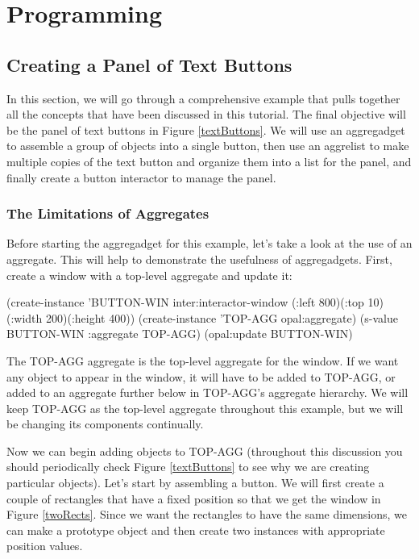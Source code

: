 \chapter{Programming}

\section{Creating a Panel of Text Buttons}
\label{big-example}

In this section, we will go through a comprehensive example that pulls
together all the concepts that have been discussed in this tutorial.
The final objective will be the panel of text buttons in Figure
\ref{textButtons}.  We will use an aggregadget to assemble a group
of objects into a single button, then use an aggrelist to make
multiple copies of the text button and organize them into a list for
the panel, and finally create a button interactor to manage the panel.


\subsection{The Limitations of Aggregates}

Before starting the aggregadget for this example, let's take a look at the use
of an aggregate.  This will help to demonstrate the usefulness of
aggregadgets.  First, create a window with a top-level aggregate and
update it:

\begin{programexample}
(create-instance 'BUTTON-WIN inter:interactor-window
   (:left 800)(:top 10)(:width 200)(:height 400))
(create-instance 'TOP-AGG opal:aggregate)
(s-value BUTTON-WIN :aggregate TOP-AGG)
(opal:update BUTTON-WIN)
\end{programexample}

The TOP-AGG aggregate is the top-level aggregate for the window.  If
we want any object to appear in the window, it will have to be added
to TOP-AGG, or added to an aggregate further below in TOP-AGG's
aggregate hierarchy.  We will keep TOP-AGG as the top-level aggregate
throughout this example, but we will be changing its components continually.

Now we can begin adding objects to TOP-AGG (throughout this discussion
you should periodically check Figure \ref{textButtons} to see why we
are creating particular objects).  Let's start by assembling a button.
We will first create a couple of rectangles that have a fixed position
so that we get the window in Figure \ref{twoRects}.  Since we
want the rectangles to have the same dimensions, we can make a
prototype object and then create two instances with appropriate
position values.

